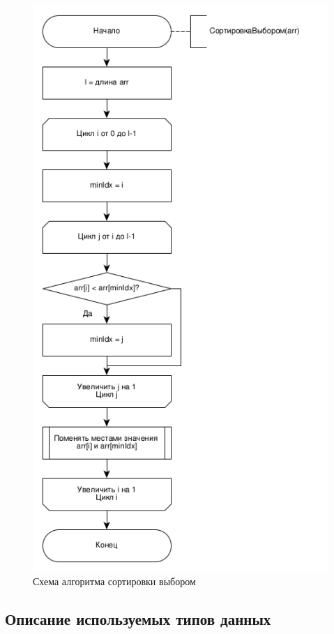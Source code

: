 \documentclass[14pt,russian]{scrartcl}
\begin{document}
\begin{figure}[h]
	\centering
	\includegraphics[scale=1]{selection.png}
	\caption{Схема алгоритма сортировки выбором}
	\label{fig:selection}
\end{figure}

\clearpage

\subsection{Описание используемых типов данных}
\end{document}
